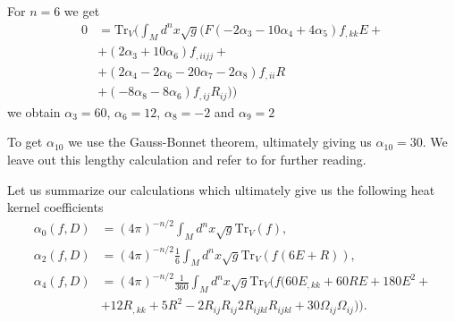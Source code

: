 For $n=6$ we get
\begin{align}
    0 &= \text{Tr}_V(\int_Md^nx\sqrt{g}
    (F(-2\alpha_3-10\alpha_4+4\alpha_5)f_{,kk}E +\\
    &+(2\alpha_3 + 10\alpha_6)f_{,iijj}+\\
    &+(2\alpha_4 -2\alpha_6 - 20\alpha_7 -2\alpha_8)f_{,ii}R\\
    &+(-8\alpha_8 -8\alpha_6)f_{,ij}R_{ij}))
\end{align}
we obtain $\alpha_3 = 60$, $\alpha_6=12$, $\alpha_8 = -2$ and $\alpha_9 = 2$

To get $\alpha_{10}$ we use the Gauss-Bonnet theorem, ultimately giving us
$\alpha_{10}=30$. We leave out this lengthy calculation and refer to
\cite{heatkernel} for further reading.

Let us summarize our calculations which ultimately give us the following heat kernel
coefficients
\begin{align}
    \alpha_0(f, D) &= (4\pi)^{-n/2}\int_M d^n x \sqrt{g} \text{Tr}_V(f),\\
    \alpha_2(f, D) &= (4\pi)^{-n/2}\frac{1}{6}\int_M d^n x \sqrt{g}
    \text{Tr}_V(f(6E+R)),\\
    \alpha_4(f, D) &= (4\pi)^{-n/2}\frac{1}{360}\int_M d^n x \sqrt{g}
    \text{Tr}_V(f(60E_{,kk}+60RE+ 180E^2 +\\
    &+12R_{,kk} + 5R^2 - 2 R_{ij}R_{ij}
    2R_{ijkl}R_{ijkl} +30\Omega_{ij}\Omega_{ij})).\\
\end{align}

